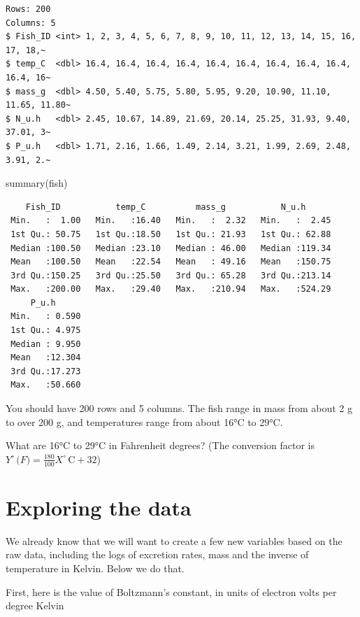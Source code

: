 \documentclass[
  letterpaper,
  DIV=11,
  numbers=noendperiod]{scrreprt}
\newenvironment{Shaded}{\begin{snugshade}}{\end{snugshade}}
\newcommand{\FunctionTok}[1]{\textcolor[rgb]{0.28,0.35,0.67}{#1}}
\newcommand{\NormalTok}[1]{\textcolor[rgb]{0.00,0.23,0.31}{#1}}
\begin{document}
\begin{verbatim}
Rows: 200
Columns: 5
$ Fish_ID <int> 1, 2, 3, 4, 5, 6, 7, 8, 9, 10, 11, 12, 13, 14, 15, 16, 17, 18,~
$ temp_C  <dbl> 16.4, 16.4, 16.4, 16.4, 16.4, 16.4, 16.4, 16.4, 16.4, 16.4, 16~
$ mass_g  <dbl> 4.50, 5.40, 5.75, 5.80, 5.95, 9.20, 10.90, 11.10, 11.65, 11.80~
$ N_u.h   <dbl> 2.45, 10.67, 14.89, 21.69, 20.14, 25.25, 31.93, 9.40, 37.01, 3~
$ P_u.h   <dbl> 1.71, 2.16, 1.66, 1.49, 2.14, 3.21, 1.99, 2.69, 2.48, 3.91, 2.~
\end{verbatim}

\begin{Shaded}
\begin{Highlighting}[]
\FunctionTok{summary}\NormalTok{(fish)}
\end{Highlighting}
\end{Shaded}

\begin{verbatim}
    Fish_ID           temp_C          mass_g           N_u.h       
 Min.   :  1.00   Min.   :16.40   Min.   :  2.32   Min.   :  2.45  
 1st Qu.: 50.75   1st Qu.:18.50   1st Qu.: 21.93   1st Qu.: 62.88  
 Median :100.50   Median :23.10   Median : 46.00   Median :119.34  
 Mean   :100.50   Mean   :22.54   Mean   : 49.16   Mean   :150.75  
 3rd Qu.:150.25   3rd Qu.:25.50   3rd Qu.: 65.28   3rd Qu.:213.14  
 Max.   :200.00   Max.   :29.40   Max.   :210.94   Max.   :524.29  
     P_u.h       
 Min.   : 0.590  
 1st Qu.: 4.975  
 Median : 9.950  
 Mean   :12.304  
 3rd Qu.:17.273  
 Max.   :50.660  
\end{verbatim}

You should have 200 rows and 5 columns. The fish range in mass from
about 2 g to over 200 g, and temperatures range from about 16°C to 29°C.

What are 16°C to 29°C in Fahrenheit degrees? (The conversion factor is
\(Y^\circ\, \mathrm(F) =  \frac{180}{100} X^\circ\, \mathrm{C} + 32\))

\section{Exploring the data}\label{exploring-the-data}

We already know that we will want to create a few new variables based on
the raw data, including the logs of excretion rates, mass and the
inverse of temperature in Kelvin. Below we do that.

First, here is the value of Boltzmann's constant, in units of electron
volts per degree Kelvin
\end{document}
